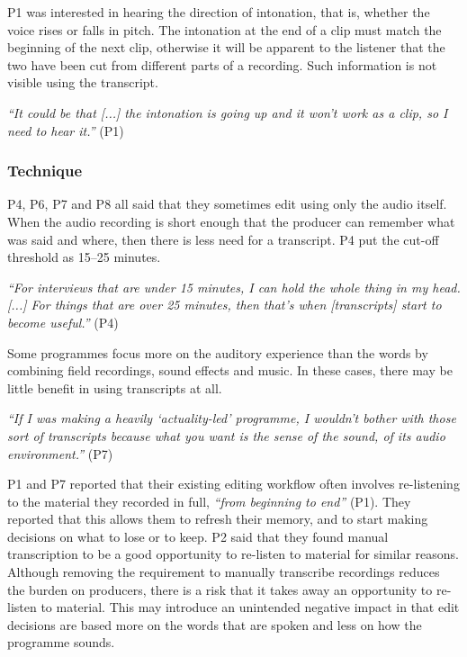 P1 was interested in hearing the direction of intonation, that is, whether the voice rises or falls in pitch.
The intonation at the end of a clip must match the beginning of the next clip, otherwise it will be
apparent to the listener that the two have been cut from different parts of a recording. Such information is not
visible using the transcript.

\textit{``It could be that [...] the intonation is going up and it won't work as a clip, so I need to hear it.''} (P1)








\subsubsection{Technique}

P4, P6, P7 and P8 all said that they sometimes edit using only the audio itself. When the audio recording 
is short enough that the producer can remember what was said and where, then there is less need for a transcript. P4
put the cut-off threshold as 15--25 minutes.

\textit{``For interviews that are under 15 minutes, I can hold the whole thing in my head. [...] For things
that are over 25 minutes, then that's when [transcripts] start to become useful.''} (P4)

Some programmes focus more on the auditory experience than the words by combining field recordings, sound effects and
music.  In these cases, there may be little benefit in using transcripts at all.

\textit{``If I was making a heavily `actuality-led' programme, I wouldn't bother with those sort of transcripts because
what you want is the sense of the sound, of its audio environment.''} (P7)

P1 and P7 reported that their existing editing workflow often involves re-listening to the material they recorded in
full, \textit{``from beginning to end''} (P1). They reported that this allows them to refresh their memory, and to
start making decisions on what to lose or to keep.
P2 said that they found manual transcription to be a good opportunity to re-listen to material for similar
reasons.
Although removing the requirement to manually transcribe recordings reduces the burden on producers, there is a risk
that it takes away an opportunity to re-listen to material. This may introduce an unintended negative impact in that
edit decisions are based more on the words that are spoken and less on how the programme sounds.

